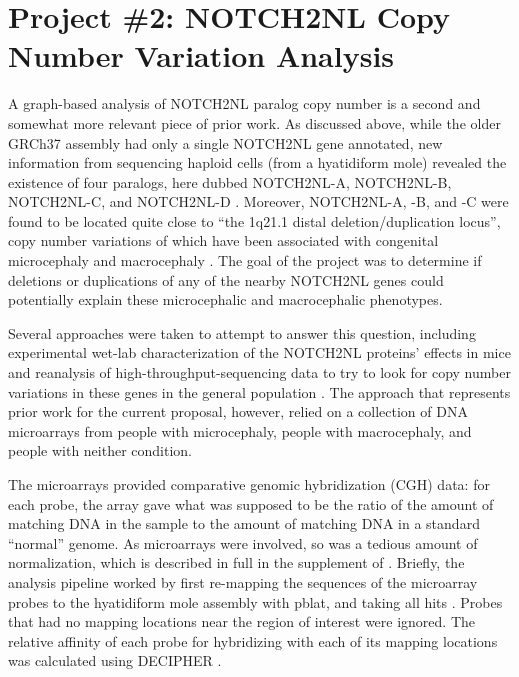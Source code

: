 \documentclass[11pt,proposal]{ucthesis}
\begin{document}

\section{Project \#2: NOTCH2NL Copy Number Variation Analysis}

A graph-based analysis of NOTCH2NL paralog copy number is a second and somewhat more relevant piece of prior work. As discussed above, while the older GRCh37 assembly had only a single NOTCH2NL gene annotated, new information from sequencing haploid cells (from a hyatidiform mole) revealed the existence of four paralogs, here dubbed NOTCH2NL-A, NOTCH2NL-B, NOTCH2NL-C, and NOTCH2NL-D \cite{jacobs2014recently}. Moreover, NOTCH2NL-A, -B, and -C were found to be located quite close to ``the 1q21.1 distal deletion/duplication locus'', copy number variations of which have been associated with congenital microcephaly and macrocephaly \cite{jacobs2014recently}. The goal of the project was to determine if deletions or duplications of any of the nearby NOTCH2NL genes could potentially explain these microcephalic and macrocephalic phenotypes.

Several approaches were taken to attempt to answer this question, including experimental wet-lab characterization of the NOTCH2NL proteins' effects in mice and reanalysis of high-throughput-sequencing data to try to look for copy number variations in these genes in the general population \cite{jacobs2014recently}. The approach that represents prior work for the current proposal, however, relied on a collection of DNA microarrays from people with microcephaly, people with macrocephaly, and people with neither condition.

The microarrays provided comparative genomic hybridization (CGH) data: for each probe, the array gave what was supposed to be the ratio of the amount of matching DNA in the sample to the amount of matching DNA in a standard ``normal'' genome. As microarrays were involved, so was a tedious amount of normalization, which is described in full in the supplement of \cite{jacobs2014recently}. Briefly, the analysis pipeline worked by first re-mapping the sequences of the microarray probes to the hyatidiform mole assembly with pblat, and taking all hits \cite{meng2012parallelized}. Probes that had no mapping locations near the region of interest were ignored. The relative affinity of each probe for hybridizing with each of its mapping locations was calculated using DECIPHER \cite{wright2012decipher}.
\end{document}
